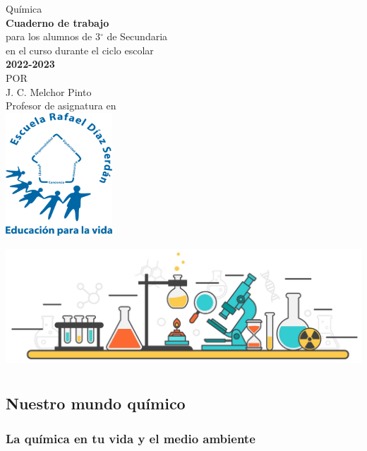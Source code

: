\documentclass[11pt]{book}
\begin{document}
\pagestyle{empty}
\begin{center}
  {\Huge Qu\'imica}\\
  \vspace{2cm}
  \normalsize
  \textbf{\large Cuaderno de trabajo}\\
  para los alumnos de 3$^\circ$ de  Secundaria\\
  en el curso durante el ciclo escolar\\
  \textbf{2022-2023}\\
  \vspace{2cm}
  \small POR\\
  \Large J. C. Melchor Pinto\\[0.5em]
  \normalsize Profesor de asignatura en\\
  \vspace{1cm}
  \includegraphics[width=4cm]{./Unidad 2/Images/LOGO_RDS_nobg}
\end{center}
\vspace{1cm}
%
\hspace{-16mm}
\includegraphics[width=\paperwidth]{./Unidad 2/Images/cover_bg}
\restoregeometry
\tableofcontents
\chapter{}
\section{Nuestro mundo químico}
\subsection{La química en tu vida y el medio ambiente }
\end{document}
